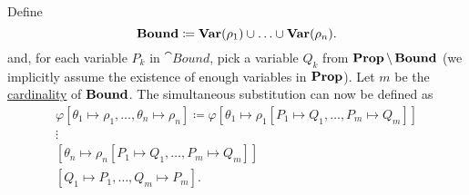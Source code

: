 \begin{definition}
\begin{thmenum}
    Define
    \begin{equation*}
      \operatorname{\mathbf{Bound}} \coloneqq \operatorname{\mathbf{Var}}(\rho_1) \cup \ldots \cup \operatorname{\mathbf{Var}}(\rho_n).
    \end{equation*}
    and, for each variable \( P_k \) in \( \cat{Bound} \), pick a variable \( Q_k \) from \( \operatorname{\mathbf{Prop}} \setminus \operatorname{\mathbf{Bound}} \) (we implicitly assume the existence of enough variables in \( \operatorname{\mathbf{Prop}} \)). Let \( m \) be the \hyperref[def:cardinal]{cardinality} of \( \operatorname{\mathbf{Bound}} \). The simultaneous substitution can now be defined as
    \begin{align*}
      \varphi[\theta_1 \mapsto \rho_1, \ldots, \theta_n \mapsto \rho_n] \coloneqq \varphi
      [\theta_1 \mapsto \rho_1[P_1 \mapsto Q_1, \ldots, P_m \mapsto Q_m]] \\
      \vdots \hspace{3cm} \\
      [\theta_n \mapsto \rho_n[P_1 \mapsto Q_1, \ldots, P_m \mapsto Q_m]] \\
      [Q_1 \mapsto P_1, \ldots, Q_m \mapsto P_m].
    \end{align*}
  \end{thmenum}
\end{definition}

